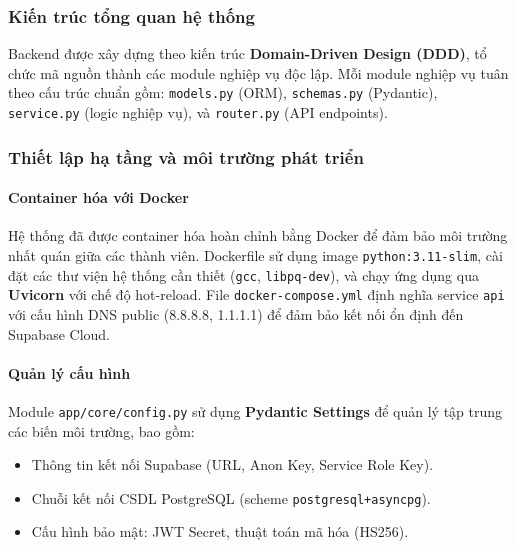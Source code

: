 \documentclass[a4paper,12pt]{article}
\begin{document}
\subsubsection{Kiến trúc tổng quan hệ thống}

Backend được xây dựng theo kiến trúc \textbf{Domain-Driven Design (DDD)}, tổ chức mã nguồn thành các module nghiệp vụ độc lập.
Mỗi module nghiệp vụ tuân theo cấu trúc chuẩn gồm: \texttt{models.py} (ORM), \texttt{schemas.py} (Pydantic), \texttt{service.py} (logic nghiệp vụ), và \texttt{router.py} (API endpoints).

\subsubsection{Thiết lập hạ tầng và môi trường phát triển}

\paragraph{Container hóa với Docker}

Hệ thống đã được container hóa hoàn chỉnh bằng Docker để đảm bảo môi trường nhất quán giữa các thành viên. Dockerfile sử dụng image \texttt{python:3.11-slim}, cài đặt các thư viện hệ thống cần thiết (\texttt{gcc}, \texttt{libpq-dev}), và chạy ứng dụng qua \textbf{Uvicorn} với chế độ hot-reload. File \texttt{docker-compose.yml} định nghĩa service \texttt{api} với cấu hình DNS public (8.8.8.8, 1.1.1.1) để đảm bảo kết nối ổn định đến Supabase Cloud.

\paragraph{Quản lý cấu hình}

Module \texttt{app/core/config.py} sử dụng \textbf{Pydantic Settings} để quản lý tập trung các biến môi trường, bao gồm:
\begin{itemize}
    \item Thông tin kết nối Supabase (URL, Anon Key, Service Role Key).
    \item Chuỗi kết nối CSDL PostgreSQL (scheme \texttt{postgresql+asyncpg}).
    \item Cấu hình bảo mật: JWT Secret, thuật toán mã hóa (HS256).
\end{itemize}
\end{document}
